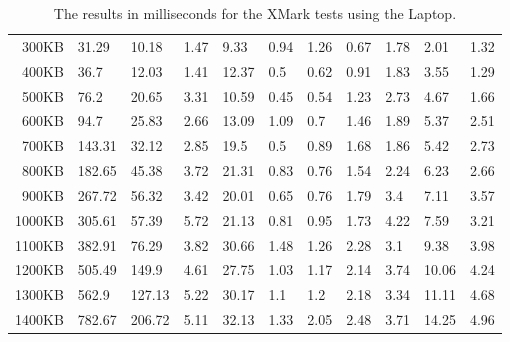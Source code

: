 \begin {table}[htpb]
\begin{tabular}{r|l|l|l|l|l|l|l|l|l|l}
300KB&31.29&10.18&1.47&9.33&0.94&1.26&0.67&1.78&2.01&1.32\\
400KB&36.7&12.03&1.41&12.37&0.5&0.62&0.91&1.83&3.55&1.29\\
500KB&76.2&20.65&3.31&10.59&0.45&0.54&1.23&2.73&4.67&1.66\\
600KB&94.7&25.83&2.66&13.09&1.09&0.7&1.46&1.89&5.37&2.51\\
700KB&143.31&32.12&2.85&19.5&0.5&0.89&1.68&1.86&5.42&2.73\\
800KB&182.65&45.38&3.72&21.31&0.83&0.76&1.54&2.24&6.23&2.66\\
900KB&267.72&56.32&3.42&20.01&0.65&0.76&1.79&3.4&7.11&3.57\\
1000KB&305.61&57.39&5.72&21.13&0.81&0.95&1.73&4.22&7.59&3.21\\
1100KB&382.91&76.29&3.82&30.66&1.48&1.26&2.28&3.1&9.38&3.98\\
1200KB&505.49&149.9&4.61&27.75&1.03&1.17&2.14&3.74&10.06&4.24\\
1300KB&562.9&127.13&5.22&30.17&1.1&1.2&2.18&3.34&11.11&4.68\\
1400KB&782.67&206.72&5.11&32.13&1.33&2.05&2.48&3.71&14.25&4.96\\
 \end{tabular}
\caption{The results in milliseconds for the XMark tests using the Laptop.}
\label{tab:xmark-laptop}
\end {table}
